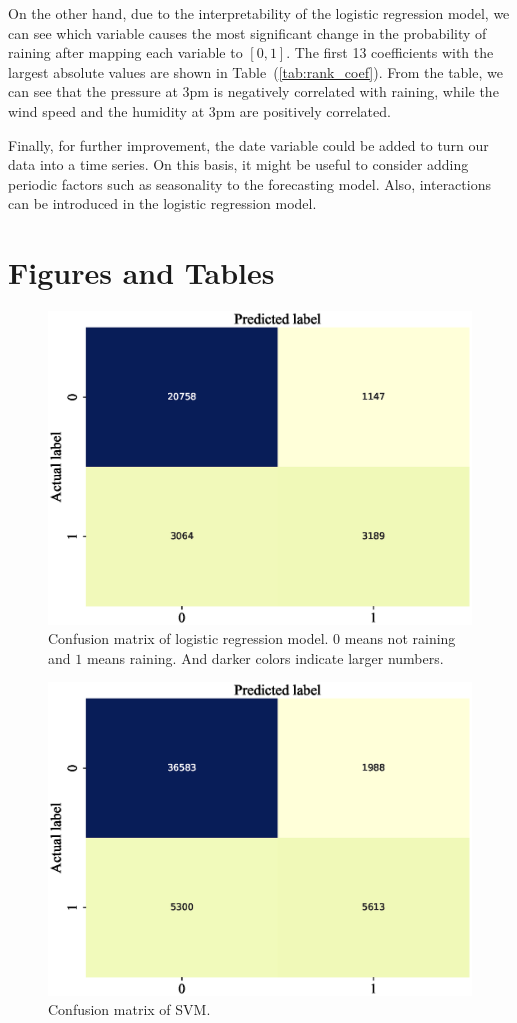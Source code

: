 \documentclass[11pt, a4paper, jou]{apa7}
\begin{document}
On the other hand, due to the interpretability of the logistic regression model, we can see which variable causes the most significant change in the probability of raining after mapping each variable to $[0,1]$. The first 13 coefficients with the largest absolute values are shown in Table~(\ref{tab:rank_coef}). From the table, we can see that the pressure at 3pm is negatively correlated with raining, while the wind speed and the humidity at 3pm are positively correlated. 

Finally, for further improvement, the date variable could be added to turn our data into a time series. On this basis, it might be useful to consider adding periodic factors such as seasonality to the forecasting model. Also, interactions can be introduced in the logistic regression model. 

\printbibliography 
\clearpage
\appendix
\section{Figures and Tables}
\begin{figure}[h]
    \centering
    \caption{Confusion matrix of logistic regression model. $0$ means not raining and $1$ means raining. And darker colors indicate larger numbers. }\label{fig:logistic_confusion}
    \includegraphics[width=.45\textwidth]{figures/Logit_confusion_matrix.eps}
\end{figure}

\begin{figure}[h]
    \centering
    \caption{Confusion matrix of SVM. }\label{fig:SVM_confusion}
    \includegraphics[width=.45\textwidth]{figures/SVM_confusion_matrix.eps}
\end{figure}
\end{document}
